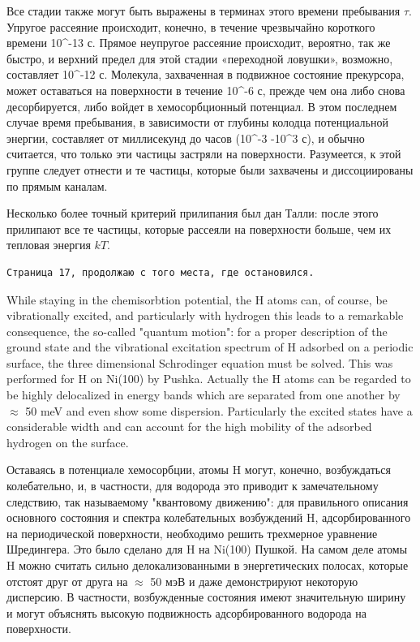 \documentclass[11pt]{article}
\begin{document}
Все стадии также могут быть выражены в терминах этого времени пребывания
\(\tau\). Упругое рассеяние происходит, конечно, в течение чрезвычайно
короткого времени 10\^{}-13 с. Прямое неупругое рассеяние происходит,
вероятно, так же быстро, и верхний предел для этой стадии «переходной
ловушки», возможно, составляет 10\^{}-12 с. Молекула, захваченная в
подвижное состояние прекурсора, может оставаться на поверхности в
течение 10\^{}-6 с, прежде чем она либо снова десорбируется, либо войдет
в хемосорбционный потенциал. В этом последнем случае время пребывания, в
зависимости от глубины колодца потенциальной энергии, составляет от
миллисекунд до часов (10\^{}-3 -10\^{}3 с), и обычно считается, что
только эти частицы застряли на поверхности. Разумеется, к этой группе
следует отнести и те частицы, которые были захвачены и диссоциированы по
прямым каналам.

Несколько более точный критерий прилипания был дан Талли: после этого
прилипают все те частицы, которые рассеяли на поверхности больше, чем их
тепловая энергия \(kT\).

    \begin{verbatim}
Страница 17, продолжаю с того места, где остановился.
\end{verbatim}

While staying in the chemisorbtion potential, the H atoms can, of
course, be vibrationally excited, and particularly with hydrogen this
leads to a remarkable consequence, the so-called "quantum motion": for a
proper description of the ground state and the vibrational excitation
spectrum of H adsorbed on a periodic surface, the three dimensional
Schrodinger equation must be solved. This was performed for H on Ni(100)
by Pushka. Actually the H atoms can be regarded to be highly delocalized
in energy bands which are separated from one another by \(\approx\) 50
meV and even show some dispersion. Particularly the excited states have
a considerable width and can account for the high mobility of the
adsorbed hydrogen on the surface.

Оставаясь в потенциале хемосорбции, атомы H могут, конечно, возбуждаться
колебательно, и, в частности, для водорода это приводит к замечательному
следствию, так называемому "квантовому движению": для правильного
описания основного состояния и спектра колебательных возбуждений H,
адсорбированного на периодической поверхности, необходимо решить
трехмерное уравнение Шредингера. Это было сделано для H на Ni(100)
Пушкой. На самом деле атомы H можно считать сильно делокализованными в
энергетических полосах, которые отстоят друг от друга на \(\approx\) 50
мэВ и даже демонстрируют некоторую дисперсию. В частности, возбужденные
состояния имеют значительную ширину и могут объяснять высокую
подвижность адсорбированного водорода на поверхности.
\end{document}
